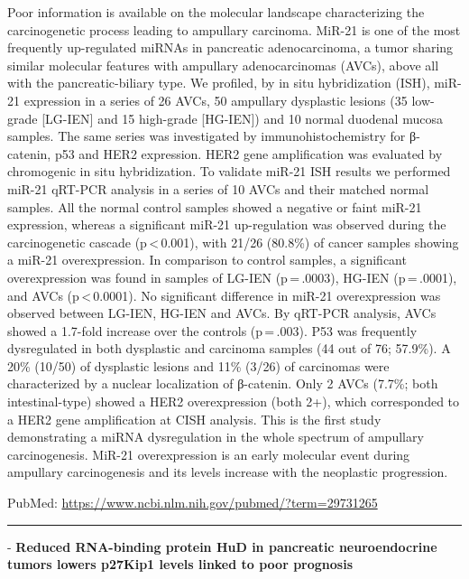 \documentclass[]{article}
\begin{document}
Poor information is available on the molecular landscape characterizing
the carcinogenetic process leading to ampullary carcinoma. MiR-21 is one
of the most frequently up-regulated miRNAs in pancreatic adenocarcinoma,
a tumor sharing similar molecular features with ampullary
adenocarcinomas (AVCs), above all with the pancreatic-biliary type. We
profiled, by in situ hybridization (ISH), miR-21 expression in a series
of 26 AVCs, 50 ampullary dysplastic lesions (35 low-grade {[}LG-IEN{]}
and 15 high-grade {[}HG-IEN{]}) and 10 normal duodenal mucosa samples.
The same series was investigated by immunohistochemistry for β-catenin,
p53 and HER2 expression. HER2 gene amplification was evaluated by
chromogenic in situ hybridization. To validate miR-21 ISH results we
performed miR-21 qRT-PCR analysis in a series of 10 AVCs and their
matched normal samples. All the normal control samples showed a negative
or faint miR-21 expression, whereas a significant miR-21 up-regulation
was observed during the carcinogenetic cascade (p\,\textless{}\,0.001),
with 21/26 (80.8\%) of cancer samples showing a miR-21 overexpression.
In comparison to control samples, a significant overexpression was found
in samples of LG-IEN (p\,=\,.0003), HG-IEN (p\,=\,.0001), and AVCs
(p\,\textless{}\,0.0001). No significant difference in miR-21
overexpression was observed between LG-IEN, HG-IEN and AVCs. By qRT-PCR
analysis, AVCs showed a 1.7-fold increase over the controls
(p\,=\,.003). P53 was frequently dysregulated in both dysplastic and
carcinoma samples (44 out of 76; 57.9\%). A 20\% (10/50) of dysplastic
lesions and 11\% (3/26) of carcinomas were characterized by a nuclear
localization of β-catenin. Only 2 AVCs (7.7\%; both intestinal-type)
showed a HER2 overexpression (both 2+), which corresponded to a HER2
gene amplification at CISH analysis. This is the first study
demonstrating a miRNA dysregulation in the whole spectrum of ampullary
carcinogenesis. MiR-21 overexpression is an early molecular event during
ampullary carcinogenesis and its levels increase with the neoplastic
progression.

PubMed: \url{https://www.ncbi.nlm.nih.gov/pubmed/?term=29731265}

{}

{}

\begin{center}\rule{0.5\linewidth}{\linethickness}\end{center}

 - \textbf{Reduced RNA-binding protein HuD in pancreatic neuroendocrine
tumors lowers p27Kip1 levels linked to poor prognosis}
\end{document}
